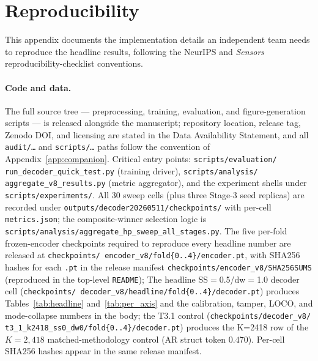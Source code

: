 \documentclass[sensors,article,submit,moreauthors,pdftex]{Definitions/mdpi}
\begin{document}

\section{Reproducibility}
\label{app3:repro}

This appendix documents the implementation details an independent team needs to reproduce the headline
results, following the NeurIPS and \emph{Sensors} reproducibility-checklist conventions.

\paragraph{Code and data.}
\label{app3:repro-code}
The full source tree --- preprocessing, training, evaluation, and figure-generation scripts --- is released
alongside the manuscript; repository location, release tag, Zenodo DOI, and licensing are stated in the Data
Availability Statement, and all \texttt{audit/\ldots} and \texttt{scripts/\ldots} paths follow the convention
of Appendix~\ref{app:companion}. Critical entry points: \texttt{scripts/\allowbreak evaluation/\allowbreak
run\_decoder\_quick\_test.py} (training driver), \texttt{scripts/\allowbreak analysis/\allowbreak
aggregate\_v8\_results.py} (metric aggregator), and the experiment shells under \texttt{scripts/experiments/}.
All 30 sweep cells (plus three Stage-3 seed replicas) are recorded under \texttt{outputs/\allowbreak decoder20260511/\allowbreak checkpoints/} with per-cell \texttt{metrics.json}; the composite-winner selection logic is \texttt{scripts/\allowbreak analysis/\allowbreak aggregate\_hp\_sweep\_all\_stages.py}. The five per-fold frozen-encoder checkpoints
required to reproduce every headline number are released at \texttt{checkpoints/\allowbreak
encoder\_v8/\allowbreak fold\{0..4\}/\allowbreak encoder.pt}, with SHA256 hashes for each \texttt{.pt} in the
release manifest \texttt{checkpoints/\allowbreak encoder\_v8/SHA256SUMS} (reproduced in the top-level
\texttt{README}); The headline SS$=$0.5/dw$=$1.0 decoder cell (\texttt{checkpoints/\allowbreak
decoder\_v8/\allowbreak headline/\allowbreak fold\{0..4\}/\allowbreak decoder.pt}) produces
Tables~\ref{tab:headline} and~\ref{tab:per_axis} and the calibration, tamper, LOCO, and mode-collapse numbers
in the body; the T3.1 control (\texttt{checkpoints/\allowbreak decoder\_v8/\allowbreak
t3\_1\_k2418\_ss0\_dw0/\allowbreak fold\{0..4\}/\allowbreak decoder.pt}) produces the K=2418 row of
the $K\!=\!2{,}418$ matched-methodology control (AR struct token $0.470$). Per-cell SHA256 hashes appear in the same release
manifest.
\end{document}
